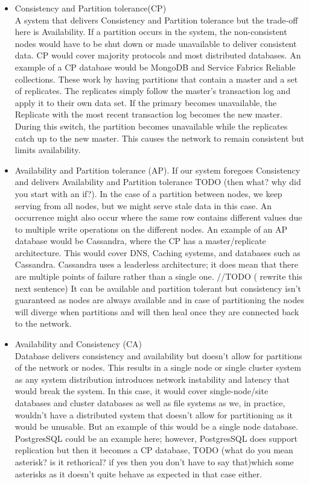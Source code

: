 \documentclass[a4paper,10pt,titlepage]{report}
\begin{document}
\begin{itemize}
\item Consistency and Partition tolerance(CP) \\ A system that delivers Consistency and Partition tolerance but the trade-off here is Availability. If a partition occurs in the system, the non-consistent nodes would have to be shut down or made unavailable to deliver consistent data. CP would cover majority protocols and most distributed databases. An example of a CP database would be MongoDB and Service Fabrics Reliable collections. These work by having partitions that contain a master and a set of replicates. The replicates simply follow the master's transaction log and apply it to their own data set. If the primary becomes unavailable, the Replicate with the most recent transaction log becomes the new master. During this switch, the partition becomes unavailable while the replicates catch up to the new master. This causes the network to remain consistent but limits availability.  \\

\item Availability and Partition tolerance (AP). If our system foregoes Consistency and delivers Availability and Partition tolerance TODO (then what? why did you start with an if?). In the case of a partition between nodes, we keep serving from all nodes, but we might serve stale data in this case. An occurrence might also occur where the same row contains different values due to multiple write operations on the different nodes. An example of an AP database would be Cassandra, where the CP has a master/replicate architecture. This would cover DNS, Caching systems, and databases such as Cassandra. Cassandra uses a leaderless architecture; it does mean that there are multiple points of failure rather than a single one.  //TODO ( rewrite this next sentence) It can be available and partition tolerant but consistency isn't guaranteed as nodes are always available and in case of partitioning the nodes will diverge when partitions and will then heal once they are connected back to the network.   \\

\item Availability and Consistency (CA) \\ Database delivers consistency and availability but doesn't allow for partitions of the network or nodes. This results in a single node or single cluster system as any system distribution introduces network instability and latency that would break the system. In this case, it would cover single-node/site databases and cluster databases as well as file systems as we, in practice, wouldn't have a distributed system that doesn't allow for partitioning as it would be unusable. But an example of this would be a single node database. PostgresSQL could be an example here; however, PostgresSQL does support replication but then it becomes a CP database, TODO (what do you mean asterisk? is it rethorical? if yes then you don't have to say that)which some asterisks\cite{aphyrpostgres} as it doesn't quite behave as expected in that case either. \\
\end{itemize}
\end{document}
